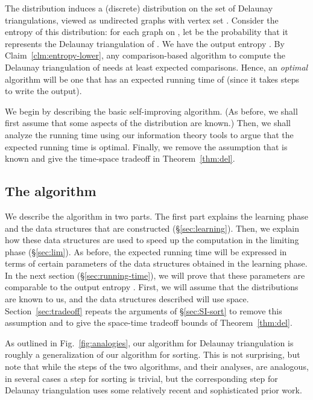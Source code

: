 \documentclass{siamltex}
\begin{document}
The distribution  induces
a (discrete) distribution on the set of Delaunay triangulations,
viewed as undirected graphs with vertex set .  
Consider the entropy
of this distribution: for each graph 
on , let  be the probability that it represents
the Delaunay triangulation of . We have 
the output entropy .
By Claim~\ref{clm:entropy-lower}, 
any comparison-based algorithm 
to compute the Delaunay triangulation of  needs
at least  expected comparisons.
Hence, an \emph{optimal} algorithm will be one that has an
expected running time of  (since it takes
 steps to write the output).

We begin by describing the basic self-improving algorithm.
(As before, we shall first assume that some aspects of the 
distribution  are known.) Then,
we shall analyze the running time using our information theory tools
to argue that the expected running time is optimal. 
Finally, we remove the assumption that  is known and
give the time-space tradeoff in Theorem~\ref{thm:del}.

\subsection{The algorithm}\label{sec:algorithm}

We describe the algorithm in two parts. The first part explains 
the learning phase and the data structures that are constructed 
(\S \ref{sec:learning}).
Then, we explain how these data structures are used to
speed up the computation in the limiting phase (\S \ref{sec:lim}). 
As before, the expected running
time will be expressed in terms of certain parameters of the
data structures obtained in the learning phase. In the next
section (\S \ref{sec:running-time}), we will prove that these parameters are 
comparable to the output 
entropy . First, we will assume 
that the distributions  are known to
us, and the data structures described will
use  space.
Section~\ref{sec:tradeoff} repeats the arguments
of \S \ref{sec:SI-sort} to remove this assumption and to
give the space-time tradeoff bounds of Theorem~\ref{thm:del}.

As outlined in Fig.~\ref{fig:analogies}, our algorithm
for Delaunay triangulation is roughly a generalization of
our algorithm for sorting.  This is not surprising, but
note that while the steps of the two algorithms, and their
analyses, are analogous, in several cases a step for sorting
is trivial, but the corresponding step for Delaunay triangulation
uses some relatively recent and sophisticated prior work.
\end{document}
